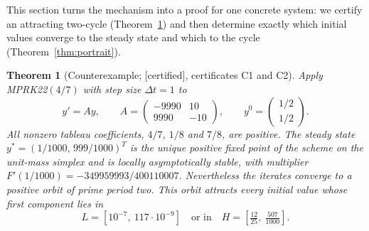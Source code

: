 \documentclass[11pt,a4paper]{article}
\theoremstyle{plain}
\newtheorem{theorem}{Theorem}
\theoremstyle{definition}
\newcommand{\status}[1]{\textsf{[#1]}}
\begin{document}
This section turns the mechanism into a proof for one concrete system: we certify an attracting two-cycle (Theorem~\ref{thm:witness}) and then determine exactly which initial values converge to the steady state and which to the cycle (Theorem~\ref{thm:portrait}).

\begin{theorem}[Counterexample; \status{certified}, certificates C1 and C2]\label{thm:witness}
Apply MPRK22$(4/7)$ with step size $\Delta t=1$ to
\begin{equation}\label{eq:witness}
 y'=Ay,\qquad A=\begin{pmatrix}-9990&10\\9990&-10\end{pmatrix},\qquad y^0=\begin{pmatrix}1/2\\1/2\end{pmatrix}.
\end{equation}
All nonzero tableau coefficients, $4/7$, $1/8$ and $7/8$, are positive. The steady state $y^*=(1/1000,\,999/1000)^T$ is the unique positive fixed point of the scheme on the unit-mass simplex and is locally asymptotically stable, with multiplier $F'(1/1000)=-349959993/400110007$. Nevertheless the iterates converge to a positive orbit of prime period two. This orbit attracts every initial value whose first component lies in
\begin{equation}\label{eq:traps}
 L=\left[10^{-7},\ 117\cdot10^{-9}\right]\quad\text{or in}\quad H=\left[\tfrac{12}{25},\ \tfrac{507}{1000}\right].
\end{equation}
\end{theorem}
\end{document}
